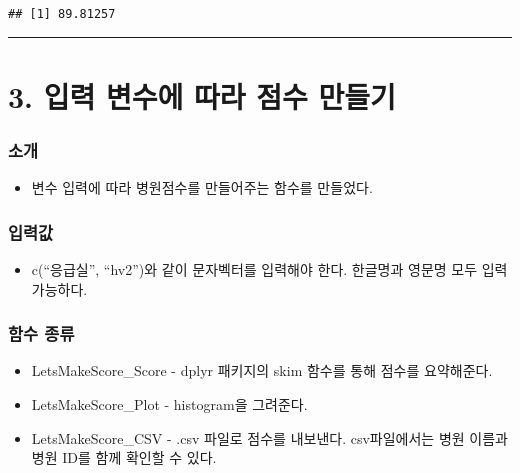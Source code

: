\documentclass[
]{article}
\providecommand{\tightlist}{%
  \setlength{\itemsep}{0pt}\setlength{\parskip}{0pt}}
\begin{document}
\begin{verbatim}
## [1] 89.81257
\end{verbatim}

\begin{center}\rule{0.5\linewidth}{0.5pt}\end{center}

\hypertarget{uxc785uxb825-uxbcc0uxc218uxc5d0-uxb530uxb77c-uxc810uxc218-uxb9ccuxb4e4uxae30}{%
\section{3. 입력 변수에 따라 점수
만들기}\label{uxc785uxb825-uxbcc0uxc218uxc5d0-uxb530uxb77c-uxc810uxc218-uxb9ccuxb4e4uxae30}}

\hypertarget{uxc18cuxac1c}{%
\subsubsection{소개}\label{uxc18cuxac1c}}

\begin{itemize}
\tightlist
\item
  변수 입력에 따라 병원점수를 만들어주는 함수를 만들었다.
\end{itemize}

\hypertarget{uxc785uxb825uxac12}{%
\subsubsection{입력값}\label{uxc785uxb825uxac12}}

\begin{itemize}
\tightlist
\item
  c(``응급실'', ``hv2'')와 같이 문자벡터를 입력해야 한다. 한글명과
  영문명 모두 입력 가능하다.
\end{itemize}

\hypertarget{uxd568uxc218-uxc885uxb958}{%
\subsubsection{함수 종류}\label{uxd568uxc218-uxc885uxb958}}

\begin{itemize}
\item
  LetsMakeScore\_Score - dplyr 패키지의 skim 함수를 통해 점수를
  요약해준다.
\item
  LetsMakeScore\_Plot - histogram을 그려준다.
\item
  LetsMakeScore\_CSV - .csv 파일로 점수를 내보낸다. csv파일에서는 병원
  이름과 병원 ID를 함께 확인할 수 있다.
\end{itemize}
\end{document}
